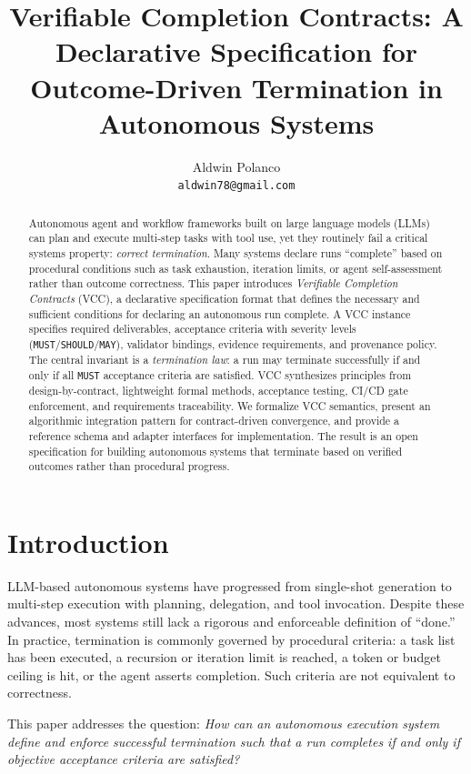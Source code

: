\documentclass[11pt]{article}
\title{Verifiable Completion Contracts: A Declarative Specification for Outcome-Driven Termination in Autonomous Systems}
\author{
  Aldwin Polanco \\
  \texttt{aldwin78@gmail.com}
}
\begin{document}
\maketitle

\begin{abstract}
Autonomous agent and workflow frameworks built on large language models (LLMs) can plan and execute multi-step tasks with tool use, yet they routinely fail a critical systems property: \emph{correct termination}. Many systems declare runs ``complete'' based on procedural conditions such as task exhaustion, iteration limits, or agent self-assessment rather than outcome correctness. This paper introduces \emph{Verifiable Completion Contracts} (VCC), a declarative specification format that defines the necessary and sufficient conditions for declaring an autonomous run complete. A VCC instance specifies required deliverables, acceptance criteria with severity levels (\texttt{MUST}/\texttt{SHOULD}/\texttt{MAY}), validator bindings, evidence requirements, and provenance policy. The central invariant is a \emph{termination law}: a run may terminate successfully if and only if all \texttt{MUST} acceptance criteria are satisfied. VCC synthesizes principles from design-by-contract, lightweight formal methods, acceptance testing, CI/CD gate enforcement, and requirements traceability. We formalize VCC semantics, present an algorithmic integration pattern for contract-driven convergence, and provide a reference schema and adapter interfaces for implementation. The result is an open specification for building autonomous systems that terminate based on verified outcomes rather than procedural progress.
\end{abstract}

\section{Introduction}
LLM-based autonomous systems have progressed from single-shot generation to multi-step execution with planning, delegation, and tool invocation. Despite these advances, most systems still lack a rigorous and enforceable definition of ``done.'' In practice, termination is commonly governed by procedural criteria: a task list has been executed, a recursion or iteration limit is reached, a token or budget ceiling is hit, or the agent asserts completion. Such criteria are not equivalent to correctness.

This paper addresses the question: \emph{How can an autonomous execution system define and enforce successful termination such that a run completes if and only if objective acceptance criteria are satisfied?}
\end{document}
